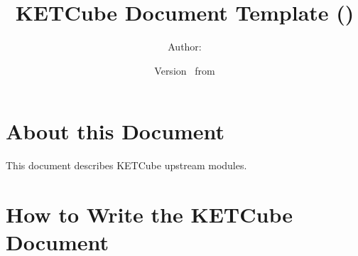   




\title{\UWBLogo KETCube Document Template (\vhCurrentVersion)}

\author{Author: \vhListAllAuthorsLongWithAbbrev}
\date{Version \vhCurrentVersion\ from \vhCurrentDate}

  




  


\section*{About this Document}


This document describes KETCube upstream modules. 

\setcounter{tocdepth}{2}
\tableofcontents
\clearpage

\listoffigures
\listoftables
\begin{versionhistory}
\end{versionhistory}
\setcounter{table}{0}

\clearpage 
{} 
\pagestyle{headings} 

\clearpage
\section{How to Write the KETCube Document}

